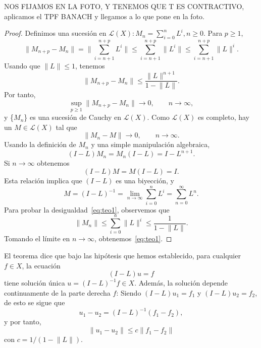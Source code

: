 NOS FIJAMOS EN LA FOTO, Y TENEMOS QUE T ES CONTRACTIVO, aplicamos el TPF BANACH y llegamos a lo que pone en la foto.
\begin{proof}
	Definimos una sucesión en $\mathcal{L}(X): M_n = \sum_{i=0}^{n}L^i, n \geqslant 0$. Para $p \geqslant 1$, 
	\begin{equation}
		\lVert M_{n+p} - M_n \rVert = \lVert \sum_{i=n+1}^{n+p}L^i \rVert \leqslant \sum_{i=n+1}^{n+p} \lVert L^i \rVert \leqslant \sum_{i=n+1}^{n+p} \lVert L \rVert^i.
	\end{equation}
	Usando que $\lVert L \rVert \leq 1$, tenemos
	\begin{equation}
		 \lVert M_{n+p} - M_n \rVert \leqslant \dfrac{\lVert L \rVert^{n+1}}{1 - \lVert L \rVert}.
	\end{equation}
	Por tanto,
	\begin{equation}
		\sup_{p \geqslant 1} \lVert M_{n+p} - M_n \rVert \rightarrow 0, \qquad n \rightarrow \infty,
	\end{equation}
	y \{$M_n$\} es una sucesión de Cauchy en $\mathcal{L}(X)$. Como $\mathcal{L}(X)$ es completo, hay un $M \in \mathcal{L}(X)$ tal que
	\begin{equation}
		\lVert M_{n} - M \rVert \rightarrow 0, \qquad n \rightarrow \infty.
	\end{equation}
	Usando la definición de $M_n$ y una simple manipulación algebraica,
	\begin{equation}
		(I-L)M_n = M_n(I-L) = I - L^{n+1}.
	\end{equation}
	Si $n \rightarrow \infty$ obtenemos
	\begin{equation}
		(I-L)M = M(I-L) = I.
	\end{equation}
	Esta relación implica que $(I-L)$ es una biyección, y
	\begin{equation}
		M = (I-L)^{-1} = \lim_{n \rightarrow \infty}\sum_{i=0}^{n}L^i = \sum_{n=0}^{\infty}L^n.
	\end{equation}
	Para probar la desigualdad~\eqref{eq:teo1}, observemos que
	\begin{equation}
		\lVert M_{n} \rVert \leqslant \sum_{i=0}^{n}\lVert L \rVert^i \leqslant \dfrac{1}{1 - \lVert L \rVert}.
	\end{equation}
	Tomando el límite en $n \rightarrow \infty$, obtenemos~\eqref{eq:teo1}.
\end{proof}
\begin{observacion}
	El teorema dice que bajo las hipótesis que hemos establecido, para cualquier $f \in X$, la ecuación
	\begin{equation}\label{eq:teo2}
		(I-L)u = f
	\end{equation}
	tiene solución única $u = (I-L)^{-1}f \in X$. Además, la solución depende continuamente de la parte derecha $f$: Siendo $(I-L)u_1 = f_1$ y $(I-L)u_2 = f_2$, de esto se sigue que
	\begin{equation}
		u_1 - u_2 = (I-L)^{-1}(f_1 - f_2),
	\end{equation}
	y por tanto,
	\begin{equation}
		\lVert u_1 - u_2 \rVert \leqslant c \lVert f_1 - f_2 \rVert
	\end{equation}
	con $c = 1/(1 - \lVert L \rVert)$.
\end{observacion}
